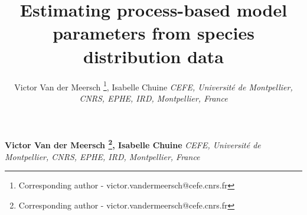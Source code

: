 \documentclass[11pt,]{article}
\title{Estimating process-based model parameters from species
distribution data  }
\author{\Large Victor Van der Meersch
\footnote{Corresponding author - victor.vandermeersch@cefe.cnrs.fr},
Isabelle Chuine\vspace{0.05in} \newline\newline\normalsize\emph{CEFE,
Université de Montpellier, CNRS, EPHE, IRD, Montpellier, France}  }
\date{}
\newcommand*{\authorfont}{\fontfamily{phv}\selectfont}
\begin{document}
%

{%
\setlength{\parindent}{0pt}
\thispagestyle{plain}
{\fontsize{18}{20}\selectfont\raggedright
\maketitle  %

}

{
   \vskip 13.5pt\relax \normalsize\fontsize{11}{12}
\textbf{\authorfont Victor Van der Meersch
\footnote{Corresponding author - victor.vandermeersch@cefe.cnrs.fr},
Isabelle Chuine} \hskip 15pt \emph{\small CEFE, Université de
Montpellier, CNRS, EPHE, IRD, Montpellier, France}   

}

}
\end{document}
